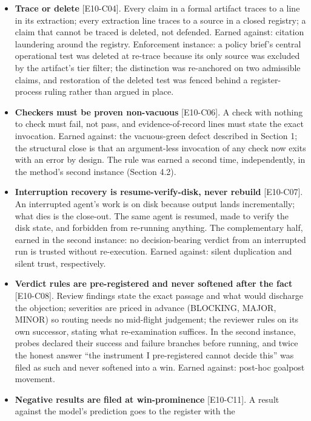 \documentclass[
  11pt,
]{article}
\begin{document}
\begin{itemize}
\item
  \textbf{Trace or delete} {[}E10-C04{]}. Every claim in a formal
  artifact traces to a line in its extraction; every extraction line
  traces to a source in a closed registry; a claim that cannot be traced
  is deleted, not defended. Earned against: citation laundering around
  the registry. Enforcement instance: a policy brief's central
  operational test was deleted at re-trace because its only source was
  excluded by the artifact's tier filter; the distinction was
  re-anchored on two admissible claims, and restoration of the deleted
  test was fenced behind a register-process ruling rather than argued in
  place.
\item
  \textbf{Checkers must be proven non-vacuous} {[}E10-C06{]}. A check
  with nothing to check must fail, not pass, and evidence-of-record
  lines must state the exact invocation. Earned against: the
  vacuous-green defect described in Section 1; the structural close is
  that an argument-less invocation of any check now exits with an error
  by design. The rule was earned a second time, independently, in the
  method's second instance (Section 4.2).
\item
  \textbf{Interruption recovery is resume-verify-disk, never rebuild}
  {[}E10-C07{]}. An interrupted agent's work is on disk because output
  lands incrementally; what dies is the close-out. The same agent is
  resumed, made to verify the disk state, and forbidden from re-running
  anything. The complementary half, earned in the second instance: no
  decision-bearing verdict from an interrupted run is trusted without
  re-execution. Earned against: silent duplication and silent trust,
  respectively.
\item
  \textbf{Verdict rules are pre-registered and never softened after the
  fact} {[}E10-C08{]}. Review findings state the exact passage and what
  would discharge the objection; severities are priced in advance
  (BLOCKING, MAJOR, MINOR) so routing needs no mid-flight judgement; the
  reviewer rules on its own successor, stating what re-examination
  suffices. In the second instance, probes declared their success and
  failure branches before running, and twice the honest answer ``the
  instrument I pre-registered cannot decide this'' was filed as such and
  never softened into a win. Earned against: post-hoc goalpost movement.
\item
  \textbf{Negative results are filed at win-prominence} {[}E10-C11{]}. A
  result against the model's prediction goes to the register with the

\end{itemize}
\end{document}
